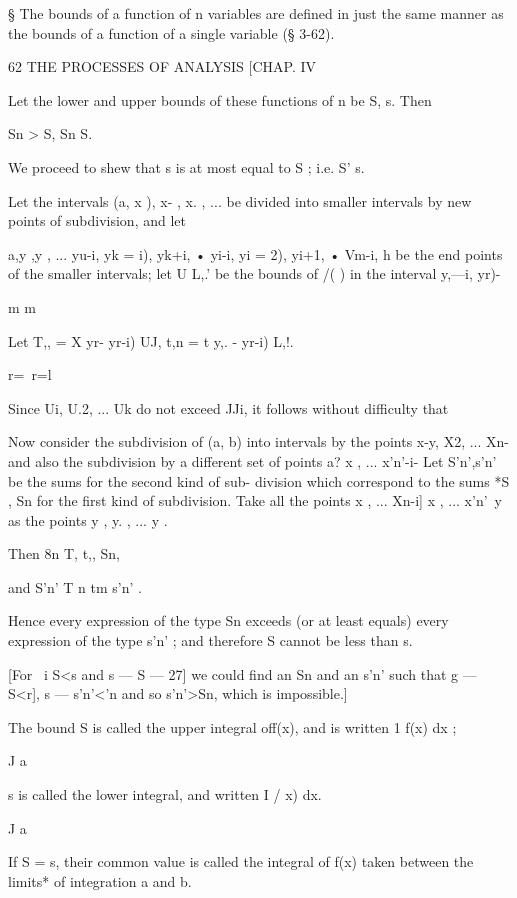§ The bounds of a function of n variables are defined in just the same manner as the bounds 
of a function of a single variable (§ 3-62). 



62 THE PROCESSES OF ANALYSIS [CHAP. IV 

Let the lower and upper bounds of these functions of n be S, s. Then 

Sn > S, Sn   S. 

We proceed to shew that s is at most equal to S ; i.e. S' s. 

Let the intervals (a, x ),  x- , x. , ... be divided into smaller intervals by 
new points of subdivision, and let 

a,y ,y , ... yu-i, yk = i), yk+i,   • yi-i, yi = 2), yi+1,  •  Vm-i, h 
be the end points of the smaller intervals; let U  L,.' be the bounds of /(  ) 
in the interval  y,—i, yr)- 

m m 

Let T,,  = X  yr- yr-i) UJ, t,n = t  y,. - yr-i) L,!. 

r=\ r=l 

Since Ui, U.2, ... Uk do not exceed JJi, it follows without difficulty that 

Now consider the subdivision of (a, b) into intervals by the points 
x-y, X2, ... Xn-\, and also the subdivision by a different set of points 
a?  x , ... x'n'-i- Let S'n',s'n' be the sums for the second kind of sub- 
division which correspond to the sums *S  , Sn for the first kind of subdivision. 
Take all the points x , ... Xn-i] x , ... x'n'\ y as the points y , y. , ... y . 

Then 8n   T,    t,,   Sn, 

and S'n'   T n   tm   s'n' . 

Hence every expression of the type Sn exceeds (or at least equals) every 
expression of the type s'n' ; and therefore S cannot be less than s. 

[For \ i S<s and s — S — 27] we could find an Sn and an s'n' such that 
g  — S<r], s — s'n'<'n and so s'n'>Sn, which is impossible.] 

The bound S is called the upper integral off(x), and is written 1 f(x) dx ; 

J a 

s is called the lower integral, and written I /  x) dx. 

J a 

If S = s, their common value is called the integral of f(x) taken between 
the limits* of integration a and b. 

